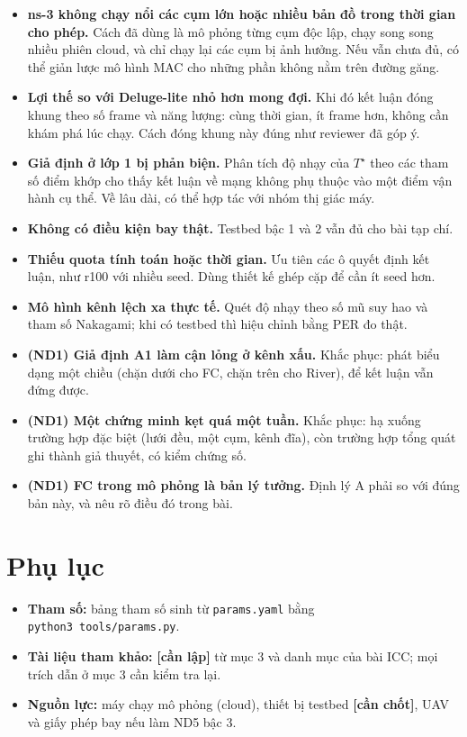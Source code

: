 \begin{itemize}
\tightlist
\item
  \textbf{ns-3 không chạy nổi các cụm lớn hoặc nhiều bản đồ trong thời
  gian cho phép.} Cách đã dùng là mô phỏng từng cụm độc lập, chạy song
  song nhiều phiên cloud, và chỉ chạy lại các cụm bị ảnh hưởng. Nếu vẫn
  chưa đủ, có thể giản lược mô hình MAC cho những phần không nằm trên
  đường găng.
\item
  \textbf{Lợi thế so với Deluge-lite nhỏ hơn mong đợi.} Khi đó kết luận
  đóng khung theo số frame và năng lượng: cùng thời gian, ít frame hơn,
  không cần khám phá lúc chạy. Cách đóng khung này đúng như reviewer đã
  góp ý.
\item
  \textbf{Giả định ở lớp 1 bị phản biện.} Phân tích độ nhạy của $T^\star$ theo
  các tham số điểm khớp cho thấy kết luận về mạng không phụ thuộc vào
  một điểm vận hành cụ thể. Về lâu dài, có thể hợp tác với nhóm thị giác
  máy.
\item
  \textbf{Không có điều kiện bay thật.} Testbed bậc 1 và 2 vẫn đủ cho
  bài tạp chí.
\item
  \textbf{Thiếu quota tính toán hoặc thời gian.} Ưu tiên các ô quyết
  định kết luận, như r100 với nhiều seed. Dùng thiết kế ghép cặp để cần
  ít seed hơn.
\item
  \textbf{Mô hình kênh lệch xa thực tế.} Quét độ nhạy theo số mũ suy hao
  và tham số Nakagami; khi có testbed thì hiệu chỉnh bằng PER đo thật.
\item
  \textbf{(ND1) Giả định A1 làm cận lỏng ở kênh xấu.} Khắc phục: phát
  biểu dạng một chiều (chặn dưới cho FC, chặn trên cho River), để kết
  luận vẫn đứng được.
\item
  \textbf{(ND1) Một chứng minh kẹt quá một tuần.} Khắc phục: hạ xuống
  trường hợp đặc biệt (lưới đều, một cụm, kênh đĩa), còn trường hợp tổng
  quát ghi thành giả thuyết, có kiểm chứng số.
\item
  \textbf{(ND1) FC trong mô phỏng là bản lý tưởng.} Định lý A phải so
  với đúng bản này, và nêu rõ điều đó trong bài.
\end{itemize}

\section*{Phụ lục}

\begin{itemize}
\tightlist
\item
  \textbf{Tham số:} bảng tham số sinh từ \texttt{params.yaml} bằng
  \texttt{python3\ tools/params.py}.
\item
  \textbf{Tài liệu tham khảo:} \textbf{{[}cần lập{]}} từ mục 3 và danh
  mục của bài ICC; mọi trích dẫn ở mục 3 cần kiểm tra lại.
\item
  \textbf{Nguồn lực:} máy chạy mô phỏng (cloud), thiết bị testbed
  \textbf{{[}cần chốt{]}}, UAV và giấy phép bay nếu làm ND5 bậc 3.
\end{itemize}
